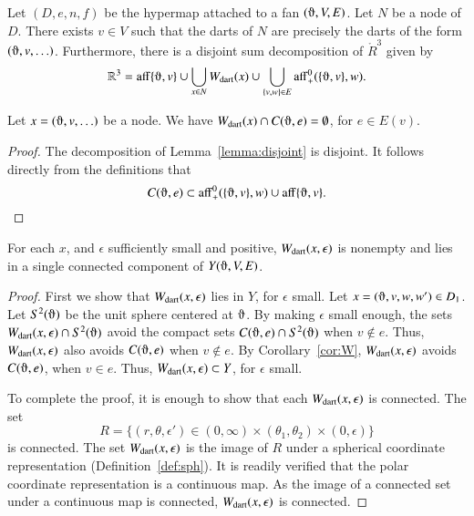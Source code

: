 \begin{lemma}
Let $(D,e,n,f)$ be the hypermap attached to a 
fan $(\orgn,V,E)$.
Let $N$ be a node of $D$.  There exists $v\in V$
such that the darts of $N$ are precisely
the darts of the form $(\orgn,v,\ldots)$.  Furthermore, there is a 
disjoint sum decomposition of $\ring{R}^3$ given by
  $$
  \ring{R}^3 = 
  \op{aff}\{\orgn,v\} \cup
  \bigcup_{x\in N} \Wdart(x)  \cup 
  \bigcup_{\{v,w\}\in E} \op{aff}_+^0(\{\orgn,v\},w).
  $$
\end{lemma}

\begin{corollary}
Let $x = (\orgn,v,\ldots)$ be a node.
We have $\Wdart(x)\cap C(\orgn,e)=\emptyset$, for $e\in E(v)$.
\end{corollary}

\begin{proof} The decomposition of Lemma~\ref{lemma:disjoint} is
disjoint.  It follows directly from the definitions that
   $$C(\orgn,e)\subset \op{aff}_+^0(\{\orgn,v\},w) \cup 
    \op{aff}\{\orgn,v\}.$$
\end{proof}

\begin{lemma} 
For each $x$, and $\epsilon$ sufficiently small and positive,
$W_{\text{dart}}(x,\epsilon)$ is nonempty and lies in a single connected
component of $Y(\orgn,V,E)$.
\end{lemma}

\begin{proof}  First we show that $W_{\text{dart}}(x,\epsilon)$ lies in $Y$,
for $\epsilon$ small.  Let $x=(\orgn,v,w,w')\in D_1$.  
Let $S^2(\orgn)$ be the unit sphere centered at $\orgn$.
By making $\epsilon$ small enough,
the sets $\Wdart(x,\epsilon)\cap S^2(\orgn)$
avoid the compact sets $C(\orgn,e)\cap S^2(\orgn)$ when $v\not\in e$.
Thus, $W_{\text{dart}}(x,\epsilon)$ also avoids $C(\orgn,e)$ when $v\not\in e$.
By Corollary~\ref{cor:W}, $W_{\text{dart}}(x,\epsilon)$ avoids $C(\orgn,e)$, when $v\in e$.
Thus, $W_{\text{dart}}(x,\epsilon)\subset Y$, for $\epsilon$ small.

To complete the proof, it is enough to show that each $W_{\text{dart}}(x,\epsilon)$ is
connected.  
The  set
   $$
   R=\{(r,\theta,\epsilon') \in (0,\infty) \times (\theta_1,\theta_2) \times (0,\epsilon)\}
   $$
is connected.
The set $W_{\text{dart}}(x,\epsilon)$  is the image of $R$
under a spherical coordinate representation (Definition~\ref{def:sph}).
It is readily verified that the polar coordinate representation is
a continuous map. As the image of a connected set under a continuous map
is connected, $W_{\text{dart}}(x,\epsilon)$ is connected.
\end{proof}

